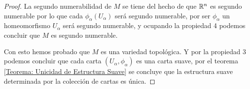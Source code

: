 \begin{proof}
	La segundo numerabilidad de $M$ se tiene del hecho de que $\mathbb{R}^n$ es segundo numerable por lo que cada $\phi_{\alpha}(U_{\alpha})$ será segundo numerable, por ser $\phi_{\alpha}$ un homeomorfismo $U_{\alpha}$ será segundo numerable, y ocupando la propiedad 4 podemos concluir que $M$ es segundo numerable.

	Con esto hemos probado que $M$ es una variedad topológica. Y por la propiedad 3 podemos concluir que cada carta $(U_{\alpha},\phi_{\alpha})$ es una carta suave, por el teorema \ref{Teorema: Unicidad de Estructura Suave} se concluye que la estructura suave determinada por la colección de cartas es única.
\end{proof}
